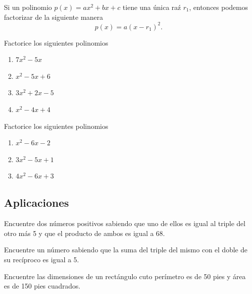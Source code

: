 	Si un polinomio $p(x)=ax^{2}+bx+c$ tiene una única ra\'z $r_{1}$, entonces podemos factorizar de la siguiente manera
	$$
	p(x)=a\left( x-r_{1} \right)^{2}.
	$$




	\begin{problema}
		\label{spi:exmp:16.2b}
		Factorice los siguientes polinomios
		\begin{enumerate}
			\item $7x^{2}-5x$
			\item $x^{2}-5x+6$
			\item $3x^{2}+2x-5$
			\item $x^{2}-4x+4$
		\end{enumerate}
		
	\end{problema}
	
	



	\begin{problema}
		\label{spi:exmp:16.3-b}
		Factorice los siguientes polinomios
		\begin{enumerate}
			\item $x^{2}-6x-2$
			\item $3x^2-5x+1$
			\item $4x^{2}-6x+3$   
		\end{enumerate}
		
	\end{problema}



\subsection{Aplicaciones}


	\begin{problema}
		\label{bron:exmp:16.21}
		Encuentre dos números positivos sabiendo que uno de ellos es igual al triple del otro más 5 y que el producto de ambos es igual a 68.
	\end{problema}
	



	\begin{problema}
		\label{bron:exmp:16.22}
		Encuentre un número sabiendo que la suma del triple del mismo con el doble de su rec\'iproco es igual a 5. 
	\end{problema}
	



	\begin{problema}
		\label{bron:exmp:16.23}
		Encuentre las dimensiones de un rectángulo cuto per\'imetro es de 50 pies y área es de 150 pies cuadrados. 
	\end{problema}



